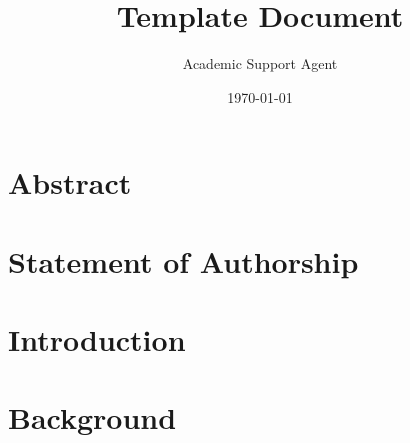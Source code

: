 \documentclass{article}
\title{Template Document}
\author{Academic Support Agent}
\date{\today}
\begin{document}
\maketitle

\frenchspacing
  \raggedbottom
  
  \pagestyle{plain}
  
  
  \singlespacing


  
  \onehalfspacing

  
  \chapter*{Abstract}

  
  \chapter*{Statement of Authorship}

  




  
  
  \pagestyle{scrheadings}
  \onehalfspacing
  
  \chapter{Introduction}\label{c:Introduction}

  
  \chapter{Background}\label{c:Background}

  
\end{document}
